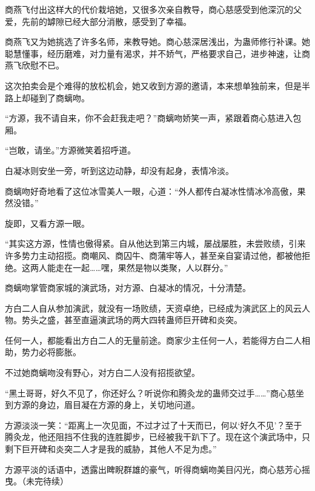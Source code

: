 \begin{this_body}
商燕飞付出这样大的代价栽培她，又很多次亲自教导，商心慈感受到他深沉的父爱，先前的罅隙已经大部分消散，感受到了幸福。

商燕飞又为她挑选了许多名师，来教导她。商心慈深居浅出，为蛊师修行补课。她聪慧懂事，经历磨难，对力量有渴求，并不娇气，严格要求自己，进步神速，让商燕飞欣慰不已。

这次拍卖会是个难得的放松机会，她又收到方源的邀请，本来想单独前来，但是半路上却碰到了商螭吻。

“方源，我不请自来，你不会赶我走吧？”商螭吻娇笑一声，紧跟着商心慈进入包厢。

“岂敢，请坐。”方源微笑着招呼道。

白凝冰则安坐一旁，听到这边动静，却没有起身，表情冷淡。

商螭吻好奇地看了这位冰雪美人一眼，心道：“外人都传白凝冰性情冰冷高傲，果然没错。”

旋即，又看方源一眼。

“其实这方源，性情也傲得紧。自从他达到第三内城，屡战屡胜，未尝败绩，引来许多势力主动招揽。商嘲风、商囚牛、商蒲牢等人，甚至亲自宴请过他，都被他拒绝。这两人能走在一起……嘿，果然是物以类聚，人以群分。”

商螭吻掌管商家城的演武场，对方源、白凝冰的情况，十分清楚。

方白二人自从参加演武，就没有一场败绩，天资卓绝，已经成为演武区上的风云人物。势头之盛，甚至直逼演武场的两大四转蛊师巨开碑和炎突。

任何一人，都能看出方白二人的无量前途。商家少主任何一人，若能得方白二人相助，势力必将膨胀。

不过她商螭吻没有野心，对方白二人没有招揽欲望。

“黑土哥哥，好久不见了，你还好么？听说你和腾灸龙的蛊师交过手……”商心慈坐到方源的身边，眉目凝在方源的身上，关切地问道。

方源淡淡一笑：“距离上一次见面，不过才过了十天而已，何以‘好久不见’？至于腾灸龙，他还阻挡不住我的连胜脚步，已经被我干趴下了。现在这个演武场中，只剩下巨开碑和炎突二人才是我的威胁，其他人不足为虑。”

方源平淡的话语中，透露出睥睨群雄的豪气，听得商螭吻美目闪光，商心慈芳心摇曳。（未完待续）

\end{this_body}

